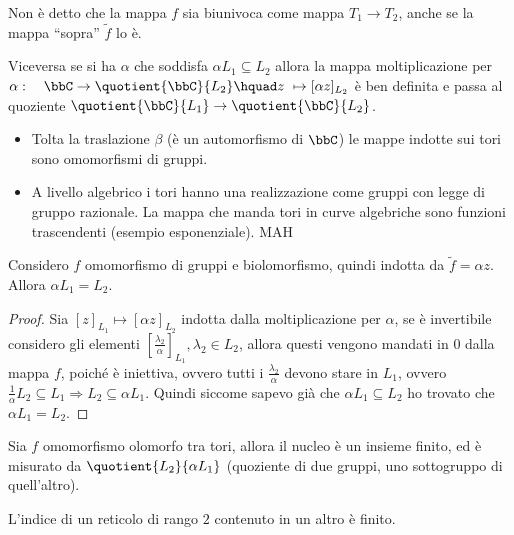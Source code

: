 
\begin{osservazione}
Non è detto che la mappa $f$ sia biunivoca come mappa $T_1\rightarrow T_2$, anche se la mappa ``sopra'' $\tilde{f}$ lo è.
\end{osservazione}

Viceversa se si ha $\alpha$ che soddisfa $\alpha L_1 \subseteq L_2$  allora la mappa moltiplicazione per $\alpha: \quad \bbC \rightarrow \quotient{\bbC}{L_2} \hquad z\ \mapsto [\alpha z]_{L_2} $ è ben definita e passa al quoziente $\quotient{\bbC}{L_1}\rightarrow \quotient{\bbC}{L_2}$.

\begin{osservazione}
\begin{itemize}
\item Tolta la traslazione $\beta$ (è un automorfismo di $\bbC$) le mappe indotte sui tori sono omomorfismi di gruppi.
\item A livello algebrico i tori hanno una realizzazione come gruppi con legge di gruppo razionale.
La mappa che manda tori in curve algebriche sono funzioni trascendenti (esempio esponenziale). MAH
\end{itemize}
\end{osservazione}


\begin{fatto} Considero $f$ omomorfismo di gruppi e biolomorfismo, quindi indotta da $\tilde{f}=\alpha z$. Allora $\alpha L_1=L_2$.
\end{fatto}
\begin{proof}
Sia $[z]_{L_1} \mapsto [\alpha z]_{L_2}$ indotta dalla moltiplicazione per $\alpha$, se è invertibile considero gli elementi $[\frac{\lambda_2}{\alpha}]_{L_1}, \lambda_2 \in L_2$, allora questi vengono mandati in $0$ dalla mappa $f$, poiché è iniettiva, ovvero tutti i $\frac{\lambda_2}{\alpha}$ devono stare in $L_1$, ovvero $\frac{1}{\alpha} L_2 \subseteq L_1 \Rightarrow L_2 \subseteq \alpha L_1$.
Quindi siccome sapevo già che $\alpha L_1 \subseteq L_2$ ho trovato che $\alpha L_1 =L_2$.
\end{proof}

\begin{esercizio} Sia $f$ omomorfismo olomorfo tra tori, allora il nucleo è un insieme finito, ed è misurato da $\quotient{L_2}{\alpha L_1}$ (quoziente di due gruppi, uno sottogruppo di quell'altro).
\end{esercizio}

\begin{esercizio}
L'indice di un reticolo di rango $2$ contenuto in un altro è finito.
\end{esercizio}

